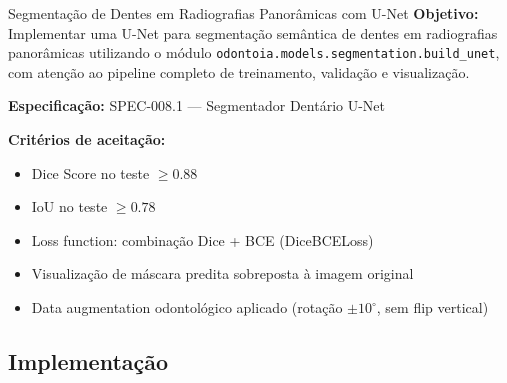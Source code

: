 \nivelquatro

\begin{pratica}{Segmentação de Dentes em Radiografias Panorâmicas com U-Net}
  \textbf{Objetivo:} Implementar uma U-Net para segmentação semântica de dentes
  em radiografias panorâmicas utilizando o módulo \texttt{odontoia.models.segmentation.build\_unet},
  com atenção ao pipeline completo de treinamento, validação e visualização.

  \textbf{Especificação:} SPEC-008.1 --- Segmentador Dentário U-Net

  \textbf{Critérios de aceitação:}
  \begin{itemize}
    \item Dice Score no teste $\geq 0.88$
    \item IoU no teste $\geq 0.78$
    \item Loss function: combinação Dice + BCE (DiceBCELoss)
    \item Visualização de máscara predita sobreposta à imagem original
    \item Data augmentation odontológico aplicado (rotação $\pm10^\circ$, sem flip vertical)
  \end{itemize}
\end{pratica}

\subsection{Implementação}

